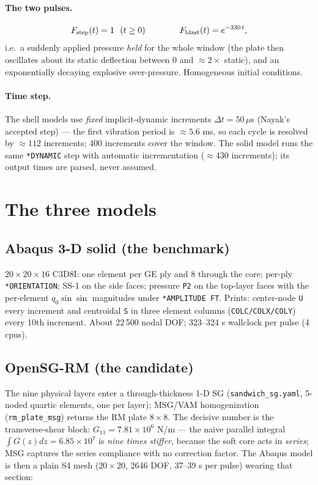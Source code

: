 \documentclass[11pt]{article}
\newcommand{\code}[1]{\texttt{#1}}
\begin{document}
\paragraph{The two pulses.}
\begin{equation}
F_{\rm step}(t)=1\ \ (t\ge0)\qquad\qquad
F_{\rm blast}(t)=e^{-330\,t},
\end{equation}
i.e.\ a suddenly applied pressure \emph{held} for the whole window (the
plate then oscillates about its static deflection between $0$ and
$\approx2\times$ static), and an exponentially decaying explosive
over-pressure.  Homogeneous initial conditions.

\paragraph{Time step.}  The shell models use \emph{fixed} implicit-dynamic
increments $\Delta t=50\,\mu$s (Nayak's accepted step) --- the first
vibration period is $\approx5.6$ ms, so each cycle is resolved by
$\approx112$ increments; 400 increments cover the window.  The solid model
runs the same \code{*DYNAMIC} step with automatic incrementation
($\approx430$ increments); its output times are parsed, never assumed.

\section{The three models}
\subsection{Abaqus 3-D solid (the benchmark)}
$20\times20\times16$ C3D8I: one element per GE ply and 8 through the core;
per-ply \code{*ORIENTATION}; SS-1 on the side faces; pressure \code{P2} on
the top-layer faces with the per-element $q_0\sin\sin$ magnitudes under
\code{*AMPLITUDE FT}.  Prints: center-node \code{U} every increment and
centroidal \code{S} in three element columns (\code{COLC/COLX/COLY}) every
10th increment.  About 22\,500 nodal DOF; 323--324 s wallclock per pulse
(4 cpus).

\subsection{OpenSG-RM (the candidate)}
The nine physical layers enter a through-thickness 1-D SG
(\code{sandwich\_sg.yaml}, 5-noded quartic elements, one per layer);
MSG/VAM homogenization (\code{rm\_plate\_msg}) returns the RM plate
$8\times8$.  The decisive number is the transverse-shear block:
$G_{11}=7.81\times10^{6}$ N/m --- the naive parallel integral
$\int G(z)dz=6.85\times10^{7}$ is \emph{nine times stiffer}, because the
soft core acts in \emph{series}; MSG captures the series compliance with
no correction factor.  The Abaqus model is then a plain S4 mesh
($20\times20$, 2646 DOF, 37--39 s per pulse) wearing that section:
\end{document}
